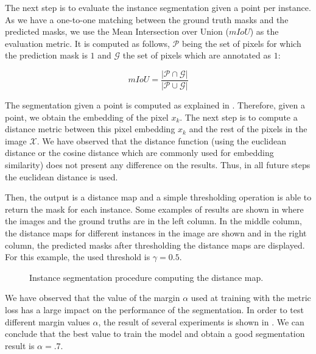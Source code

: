 The next step is to evaluate the instance segmentation given a point per instance.
As we have a one-to-one matching between the ground truth masks and the predicted masks, we use the Mean Intersection over Union ($mIoU$) as the evaluation metric.
It is computed as follows, $\mathcal{P}$ being the set of pixels for which the prediction mask is $1$ and $\mathcal{G}$ the set of pixels which are annotated as $1$:

\begin{equation}
  mIoU = \frac{|\mathcal{P} \cap \mathcal{G}|}{|\mathcal{P} \cup \mathcal{G}|}
\end{equation}

The segmentation given a point is computed as explained in .
Therefore, given a point, we obtain the embedding of the pixel $x_k$.
The next step is to compute a distance metric between this pixel embedding $x_k$ and the rest of the pixels in the image $\mathcal{X}$.
We have observed that the distance function (using the euclidean distance or the cosine distance which are commonly used for embedding similarity) does not present any difference on the results.
Thus, in all future steps the euclidean distance is used.

Then, the output is a distance map and a simple thresholding operation is able to return the mask for each instance.
Some examples of results are shown in  where the images and the ground truths are in the left column.
In the middle column, the distance maps for different instances in the image are shown and in the right column, the predicted masks after thresholding the distance maps are displayed.
For this example, the used threshold is $\gamma = 0.5$.

\begin{figure}[h]
  \centering
  \caption{Instance segmentation procedure computing the distance map.}
  \label{fig:experiments:segmentation:distancemaps}
\end{figure}

We have observed that the value of the margin $\alpha$ used at training with the metric loss has a large impact on the performance of the segmentation.
In order to test different margin values $\alpha$, the result of several experiments is shown in .
We can conclude that the best value to train the model and obtain a good segmentation result is $\alpha = .7$.

